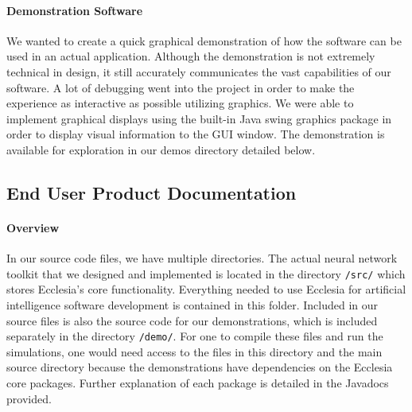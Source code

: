 \documentclass[letterpaper, 10pt]{article}
\begin{document}
		\paragraph{Demonstration Software} We wanted to create a quick graphical demonstration of how the software can be used in an actual application. Although the demonstration is not extremely technical in design, it still accurately communicates the vast capabilities of our software. A lot of debugging went into the project in order to make the experience as interactive as possible utilizing graphics. We were able to implement graphical displays using the built-in Java swing graphics package in order to display visual information to the GUI window. The demonstration is available for exploration in our demos directory detailed below.
	
	\clearpage
	\subsection{End User Product Documentation}
		\paragraph{Overview}
		In our source code files, we have multiple directories. The actual neural network toolkit that we designed and implemented is located in the directory \texttt{/src/} which stores Ecclesia's core functionality. Everything needed to use Ecclesia for artificial intelligence software development is contained in this folder. Included in our source files is also the source code for our demonstrations, which is included separately in the directory \texttt{/demo/}. For one to compile these files and run the simulations, one would need access to the files in this directory and the main source directory because the demonstrations have dependencies on the Ecclesia core packages. Further explanation of each package is detailed in the Javadocs provided.
\end{document}
